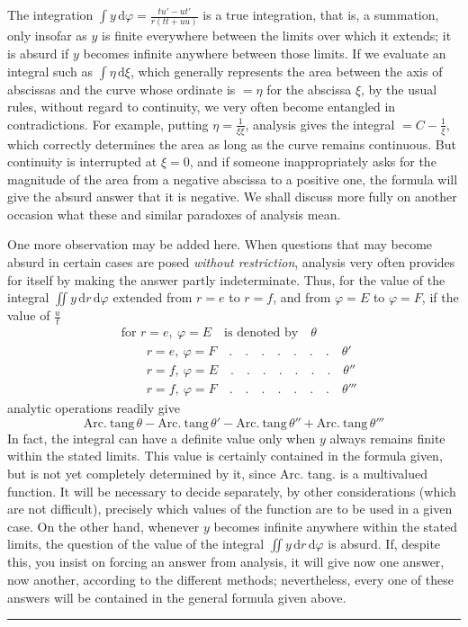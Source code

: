 The integration $\int y\,\mathrm d\varphi=\frac{tu'-ut'}{r(tt+uu)}$ is a true integration, that is, a summation, only insofar as $y$ is finite everywhere between the limits over which it extends; it is absurd if $y$ becomes infinite anywhere between those limits. If we evaluate an integral such as $\int\eta\,\mathrm d\xi$, which generally represents the area between the axis of abscissas and the curve whose ordinate is $=\eta$ for the abscissa $\xi$, by the usual rules, without regard to continuity, we very often become entangled in contradictions. For example, putting $\eta=\frac1{\xi\xi}$, analysis gives the integral $=C-\frac1\xi$, which correctly determines the area as long as the curve remains continuous. But continuity is interrupted at $\xi=0$, and if someone inappropriately asks for the magnitude of the area from a negative abscissa to a positive one, the formula will give the absurd answer that it is negative. We shall discuss more fully on another occasion what these and similar paradoxes of analysis mean.

One more observation may be added here. When questions that may become absurd in certain cases are posed \textit{without restriction}, analysis very often provides for itself by making the answer partly indeterminate. Thus, for the value of the integral $\iint y\,\mathrm dr\,\mathrm d\varphi$ extended from $r=e$ to $r=f$, and from $\varphi=E$ to $\varphi=F$, if the value of $\frac ut$
\[
\begin{aligned}
&\text{for }r=e,\ \varphi=E\quad\text{is denoted by}\quad\theta\\
&\qquad r=e,\ \varphi=F\quad .\quad .\quad .\quad .\quad .\quad .\quad .\quad\theta'\\
&\qquad r=f,\ \varphi=E\quad .\quad .\quad .\quad .\quad .\quad .\quad .\quad\theta''\\
&\qquad r=f,\ \varphi=F\quad .\quad .\quad .\quad .\quad .\quad .\quad .\quad\theta'''
\end{aligned}
\]
analytic operations readily give
\[
\mathrm{Arc.\ tang}\,\theta-\mathrm{Arc.\ tang}\,\theta'-\mathrm{Arc.\ tang}\,\theta''+\mathrm{Arc.\ tang}\,\theta'''
\]
In fact, the integral can have a definite value only when $y$ always remains finite within the stated limits. This value is certainly contained in the formula given, but is not yet completely determined by it, since Arc. tang. is a multivalued function. It will be necessary to decide separately, by other considerations (which are not difficult), precisely which values of the function are to be used in a given case. On the other hand, whenever $y$ becomes infinite anywhere within the stated limits, the question of the value of the integral $\iint y\,\mathrm dr\,\mathrm d\varphi$ is absurd. If, despite this, you insist on forcing an answer from analysis, it will give now one answer, now another, according to the different methods; nevertheless, every one of these answers will be contained in the general formula given above.
\begin{center}\rule{3cm}{0.3pt}\end{center}
